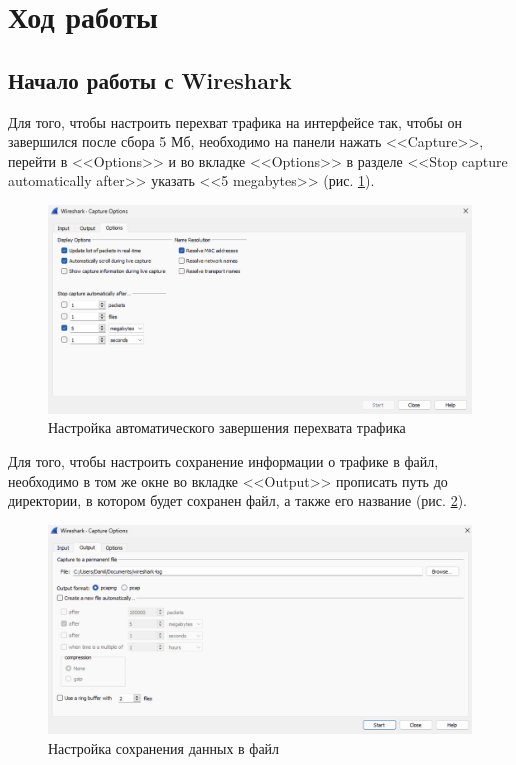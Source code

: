 \documentclass[a4paper, 14pt]{extarticle}
\begin{document}
\section{Ход работы}

\subsection{Начало работы с Wireshark}

Для того, чтобы настроить перехват трафика на интерфейсе так, чтобы он
завершился после сбора 5 Мб, необходимо на панели нажать <<Capture>>, перейти в
<<Options>> и во вкладке <<Options>> в разделе <<Stop capture automatically
after>> указать <<5 megabytes>> (рис. \ref{fig:stop-capture-after-5-mb}).

\begin{figure}[H]
  \centering
  \includegraphics[width=\textwidth]{images/stop-capture-after-5-mb.png}
  \caption{Настройка автоматического завершения перехвата трафика}
  \label{fig:stop-capture-after-5-mb}
\end{figure}

Для того, чтобы настроить сохранение информации о трафике в файл, необходимо в
том же окне во вкладке <<Output>> прописать путь до директории, в котором будет
сохранен файл, а также его название (рис. \ref{fig:save-log-to-file}).

\begin{figure}[H]
  \centering
  \includegraphics[width=\textwidth]{images/save-log-to-file.png}
  \caption{Настройка сохранения данных в файл}
  \label{fig:save-log-to-file}
\end{figure}
\end{document}
